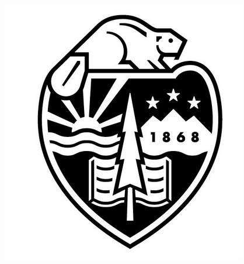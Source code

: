 \documentclass[aspectratio=169]{beamer}
\theoremstyle{remark}
\begin{document}
\begin{frame}
\begin{columns}
\begin{column}{0.33\textwidth}
{            }
        \end{column}
        \begin{column}{0.33\textwidth}
            \centering
            \includegraphics[height=0.35\textheight]{./figures/oregon-state.png}
            

\end{column}
\end{columns}
\end{frame}
\end{document}

